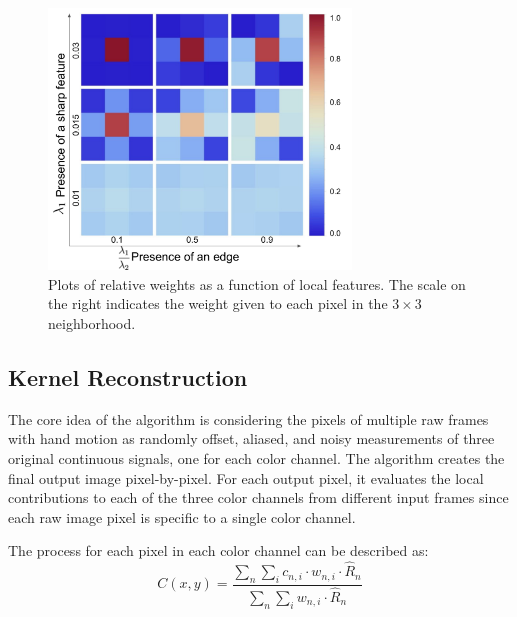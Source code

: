 \documentclass{sig-alternate}
\begin{document}
\begin{figure}
\centering
\includegraphics[width=19pc]{figures/Wronski2019-figure-8.pdf}
\caption{Plots of relative weights as a function of local features. The scale on the right indicates the weight given to each pixel in the $3\times 3$ neighborhood.~\cite{Wronski2019}}
\label{fig:Wronski2019Fig8}
\end{figure}

\pagebreak

\subsection{Kernel Reconstruction}
\label{sec:kernelReconstruction}

The core idea of the algorithm is considering the pixels of multiple raw frames with hand motion as randomly offset, aliased, and noisy measurements of three original continuous signals, one for each color channel. The algorithm creates the final output image pixel-by-pixel. For each output pixel, it evaluates the local contributions to each of the three color channels from different input frames since each raw image pixel is specific to a single color channel. 

The process for each pixel in each color channel can be described as:
\begin{equation*}
C(x, y)=\frac{\sum_{n} \sum_{i} c_{n, i} \cdot w_{n, i} \cdot \hat{R}_{n}}{\sum_{n} \sum_{i} w_{n, i} \cdot \hat{R}_{n}}
\end{equation*}
\end{document}
